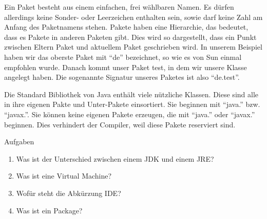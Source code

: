 Ein Paket besteht aus einem einfachen, frei wählbaren Namen. Es dürfen allerdings keine Sonder- oder Leerzeichen enthalten sein, sowie darf keine Zahl am Anfang des Paketnamens stehen. Pakete haben eine Hierarchie, das bedeutet, dass es Pakete in anderen Paketen gibt. Dies wird so dargestellt, dass ein Punkt zwischen Eltern Paket und aktuellem Paket geschrieben wird. In unserem Beispiel haben wir das oberste Paket mit "`de"' bezeichnet, so wie es von Sun einmal empfohlen wurde. Danach kommt unser Paket test, in dem wir unsere Klasse angelegt haben. Die sogenannte Signatur unseres Paketes ist also "`de.test"'. 

Die Standard Bibliothek von Java enthält viele nützliche Klassen. Diese sind alle in ihre eigenen Pakte und Unter-Pakete einsortiert. Sie beginnen mit "`java."' bzw. "`javax."'. Sie können keine eigenen Pakete erzeugen, die mit "`java."' oder "`javax."' beginnen. Dies verhindert der Compiler, weil diese Pakete reserviert sind.

\begin{xcb}{Aufgaben}
\begin{enumerate}
\item Was ist der Unterschied zwischen einem JDK und einem JRE?
\item Was ist eine Virtual Machine?
\item Wofür steht die Abkürzung IDE?
\item Was ist ein Package?
\end{enumerate}

\end{xcb}